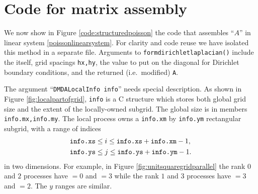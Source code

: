 \medskip
\section{Code for matrix assembly}

We now show in Figure \ref{code:structuredpoisson} the code that assembles ``$A$'' in linear system \eqref{poissonlinearsystem}.  For clarity and code reuse we have isolated this method in a separate file.  Arguments to \texttt{formdirichletlaplacian()} include the \pDM itself, grid spacings \texttt{hx,hy}, the value to put on the diagonal for Dirichlet boundary conditions, and the returned (i.e.~modified) \pMat \texttt{A}.


The argument ``\texttt{DMDALocalInfo info}'' needs special description.  As shown in Figure \ref{fig:localpartofgrid}, \texttt{info} is a C structure which stores both global grid size and the extent of the locally-owned subgrid.  The global size is in members \texttt{info.mx,info.my}.  The local process owns a \texttt{info.xm} by \texttt{info.ym} rectangular subgrid, with a range of indices
\begin{align*}
&\text{\texttt{info.xs}} \le i \le \text{\texttt{info.xs}} +\text{\texttt{info.xm}}-1, \\
&\text{\texttt{info.ys}} \le j \le \text{\texttt{info.ys}} +\text{\texttt{info.ym}}-1.
\end{align*}
in two dimensions.  For example, in Figure \ref{fig:unitsquaregridparallel} the rank $0$ and $2$ processes have  $=0$ and  $=3$ while the rank $1$ and $3$ processes have  $=3$ and  $=2$.  The $y$ ranges are similar.

